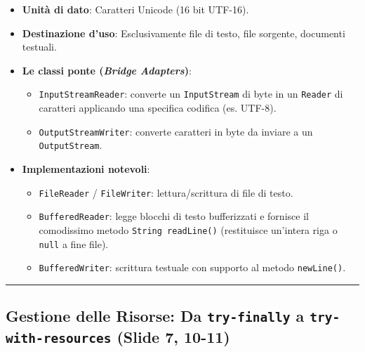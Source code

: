 \documentclass[11pt,a4paper,oneside]{report}
\newcommand{\passthrough}[1]{#1}
\providecommand{\tightlist}{\setlength{\itemsep}{0pt}\setlength{\parskip}{0pt}}
\begin{document}
\begin{itemize}
\tightlist
\item
  \textbf{Unità di dato}: Caratteri Unicode (16 bit UTF-16).
\item
  \textbf{Destinazione d'uso}: Esclusivamente file di testo, file
  sorgente, documenti testuali.
\item
  \textbf{Le classi ponte (\emph{Bridge Adapters})}:

  \begin{itemize}
  \tightlist
  \item
    \passthrough{\lstinline!InputStreamReader!}: converte un
    \passthrough{\lstinline!InputStream!} di byte in un
    \passthrough{\lstinline!Reader!} di caratteri applicando una
    specifica codifica (es. UTF-8).
  \item
    \passthrough{\lstinline!OutputStreamWriter!}: converte caratteri in
    byte da inviare a un \passthrough{\lstinline!OutputStream!}.
  \end{itemize}
\item
  \textbf{Implementazioni notevoli}:

  \begin{itemize}
  \tightlist
  \item
    \passthrough{\lstinline!FileReader!} /
    \passthrough{\lstinline!FileWriter!}: lettura/scrittura di file di
    testo.
  \item
    \passthrough{\lstinline!BufferedReader!}: legge blocchi di testo
    bufferizzati e fornisce il comodissimo metodo
    \passthrough{\lstinline!String readLine()!} (restituisce un'intera
    riga o \passthrough{\lstinline!null!} a fine file).
  \item
    \passthrough{\lstinline!BufferedWriter!}: scrittura testuale con
    supporto al metodo \passthrough{\lstinline!newLine()!}.
  \end{itemize}
\end{itemize}

\begin{center}\rule{0.5\linewidth}{0.5pt}\end{center}

\subsection{\texorpdfstring{Gestione delle Risorse: Da
\texttt{try-finally} a \texttt{try-with-resources} (Slide 7,
10-11)}{Gestione delle Risorse: Da try-finally a try-with-resources (Slide 7, 10-11)}}\label{chap19_gestione-delle-risorse-da-try-finally-a-try-with-resources-slide-7-10-11}
\end{document}
